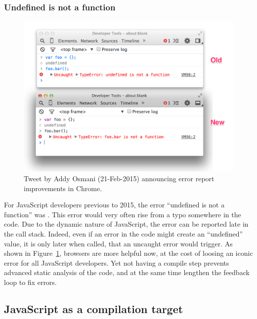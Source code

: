\subsubsection{Undefined is not a function}%
\label{ssub:undefined_is_not_a_function}

\begin{figure}[ht]
	\centering
	\includegraphics[width=1.0\linewidth]{assets/img/undefined-improved.png}
	\caption{Tweet by Addy Osmani (21-Feb-2015) announcing error report improvements in Chrome.}%
	\label{fig:undefined-improved}
\end{figure}

For JavaScript developers previous to 2015,
the error ``undefined is not a function'' was .
This error would very often rise from a typo somewhere in the code.
Due to the dynamic nature of JavaScript, the error can be reported late in the call stack.
Indeed, even if an error in the code might create an ``undefined'' value,
it is only later when called, that an uncaught error would trigger.
As shown in Figure~\ref{fig:undefined-improved}, browsers are more helpful now,
at the cost of loosing an iconic error for all JavaScript developers.
Yet not having a compile step prevents advanced static analysis of the code,
and at the same time lengthen the feedback loop to fix errors.


\subsection{JavaScript as a compilation target}%
\label{sub:javascript_as_a_compilation_target}

